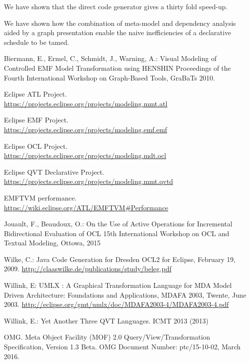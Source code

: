 \documentclass{llncs}
\begin{document}
We have shown that the direct code generator gives a thirty fold speed-up.

We have shown how the combination of meta-model and dependency analysis aided by a graph presentation enable the naive inefficiencies of a declarative schedule to be tamed.

%
%
\begin{thebibliography}{5}
Biermann, E., Ermel, C., Schmidt, J., Warning, A.:
Visual Modeling of Controlled EMF Model Transformation using HENSHIN
Proceedings of the Fourth International Workshop on Graph-Based Tools, GraBaTs 2010.

Eclipse ATL Project.\\
\url{https://projects.eclipse.org/projects/modeling.mmt.atl}

Eclipse EMF Project.\\
\url{https://projects.eclipse.org/projects/modeling.emf.emf}

Eclipse OCL Project.\\
\url{https://projects.eclipse.org/projects/modeling.mdt.ocl}

Eclipse QVT Declarative Project.\\
\url{https://projects.eclipse.org/projects/modeling.mmt.qvtd}

EMFTVM performance.\\
\url{https://wiki.eclipse.org/ATL/EMFTVM\#Performance}

Jouault, F., Beaudoux, O.:
On the Use of Active Operations for Incremental Bidirectional Evaluation of OCL
15th International Workshop on OCL and Textual Modeling, Ottowa, 2015

Wilke, C.: Java Code Generation for Dresden OCL2 for Eclipse, February 19, 2009.
\url{http://claaswilke.de/publications/study/beleg.pdf}

Willink, E: UMLX : A Graphical Transformation Language for MDA
Model Driven Architecture: Foundations and Applications, MDAFA 2003, Twente, June 2003.
\url{http://eclipse.org/gmt/umlx/doc/MDAFA2003-4/MDAFA2003-4.pdf}

Willink, E.:
Yet Another Three QVT Languages.
ICMT 2013 (2013)

OMG. Meta Object Facility (MOF) 2.0 Query/View/Transformation Specification, Version 1.3 Beta.
OMG Document Number: ptc/15-10-02, March 2016.
\end{thebibliography}
\end{document}
